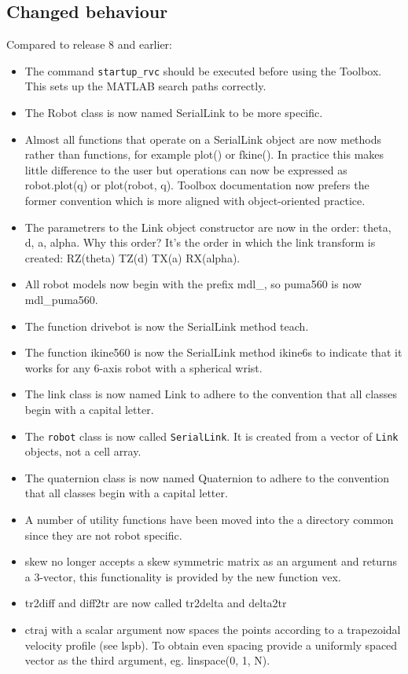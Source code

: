 \documentclass[a4paper]{report}
\begin{document}
\subsection{Changed behaviour}
Compared to release 8 and earlier:
\begin{itemize}
\item The command \texttt{startup\_rvc} should be executed before using the Toolbox.  This sets up the MATLAB search paths correctly.
\item The Robot class is now named SerialLink to be more specific.
\item Almost all functions that operate on a SerialLink object are now methods rather than functions, for example plot() or fkine(). In practice this makes little difference to the user but operations can now be expressed as robot.plot(q) or plot(robot, q). Toolbox documentation now prefers the former convention which is more aligned with object-oriented practice.
\item The parametrers to the Link object constructor are now in the order: theta, d, a, alpha. Why this order? It's the order in which the link transform is created: RZ(theta) TZ(d) TX(a) RX(alpha).
\item All robot models now begin with the prefix mdl\_, so puma560 is now mdl\_puma560.
\item The function drivebot is now the SerialLink method teach.
\item The function ikine560 is now the SerialLink method ikine6s to indicate that it works for any 6-axis robot with a spherical wrist.
\item The link class is now named Link to adhere to the convention that all classes begin with a capital letter.
\item The \texttt{robot} class is now called \texttt{SerialLink}.  It is created from a vector of \texttt{Link} objects, not a cell array.
\item The quaternion class is now named Quaternion to adhere to the convention that all classes begin with a capital letter.
\item A number of utility functions have been moved into the a directory common since they are not robot specific.
\item skew no longer accepts a skew symmetric matrix as an argument and returns a 3-vector, this functionality is provided by the new function vex.
\item tr2diff and diff2tr are now called tr2delta and delta2tr
\item ctraj with a scalar argument now spaces the points according to a trapezoidal velocity profile (see lspb). To obtain even spacing provide a uniformly spaced vector as the third argument, eg. linspace(0, 1, N).

\end{itemize}
\end{document}
